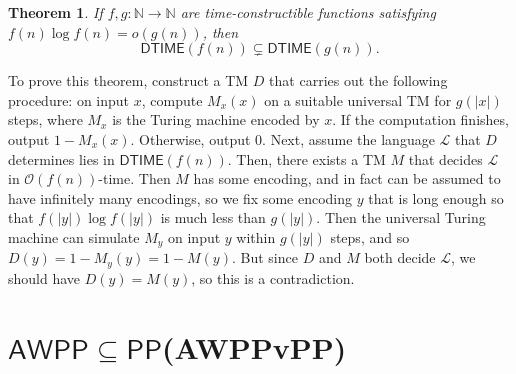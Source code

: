 \documentclass[12pt]{article}
\newtheorem{theorem}{Theorem}[section]
\theoremstyle{definition}
\theoremstyle{remark}
\newcommand{\N}{\mathbb{N}}
\newcommand{\ra}{\rightarrow}
\newcommand{\cL}{\mathcal{L}}
\newcommand{\msf}[1]{\mathsf{#1}}
\newcommand{\Oh}{\mathcal{O}}
\begin{document}
\begin{theorem}
If $f,g:\N\ra\N$ are time-constructible functions satisfying
$f(n)\log f(n)=o(g(n))$, then
\[
\msf{DTIME}(f(n))\subsetneq\msf{DTIME}(g(n)).
\]
\end{theorem}
To prove this theorem, construct a TM $D$ that carries out the following
procedure: on input $x$, compute $M_x(x)$ on a suitable universal TM for
$g(|x|)$ steps, where $M_x$ is the Turing machine encoded by $x$. If the
computation finishes, output $1-M_x(x)$. Otherwise, output $0$. Next, assume the
language $\cL$ that $D$ determines lies in $\msf{DTIME}(f(n))$. Then, there
exists a TM $M$ that decides $\cL$ in $\Oh(f(n))$-time. Then $M$ has some
encoding, and in fact can be assumed to have infinitely many encodings, so we
fix some encoding $y$ that is long enough so that $f(|y|)\log f(|y|)$ is much
less than $g(|y|)$. Then the universal Turing machine can simulate $M_y$ on
input $y$ within $g(|y|)$ steps, and so $D(y)=1-M_y(y)=1-M(y)$. But since $D$
and $M$ both decide $\cL$, we should have $D(y)=M(y)$, so this is a
contradiction.

\section{$\msf{AWPP}\subseteq\msf{PP}$(AWPPvPP)}
\end{document}
